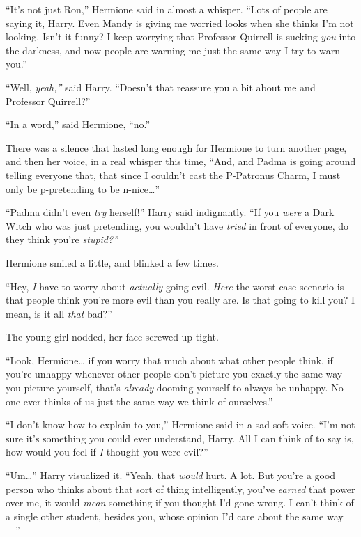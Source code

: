 ``It's not just Ron,'' Hermione said in almost a whisper. ``Lots of
people are saying it, Harry. Even Mandy is giving me worried looks when
she thinks I'm not looking. Isn't it funny? I keep worrying that
Professor Quirrell is sucking \emph{you} into the darkness, and now
people are warning me just the same way I try to warn you.''

``Well, \emph{yeah,''} said Harry. ``Doesn't that reassure you a bit
about me and Professor Quirrell?''

``In a word,'' said Hermione, ``no.''

There was a silence that lasted long enough for Hermione to turn another
page, and then her voice, in a real whisper this time, ``And, and Padma
is going around telling everyone that, that since I couldn't cast the
P-Patronus Charm, I must only be p-pretending to be n-nice\ldots{}''

``Padma didn't even \emph{try} herself!'' Harry said indignantly. ``If
you \emph{were} a Dark Witch who was just pretending, you wouldn't have
\emph{tried} in front of everyone, do they think you're \emph{stupid?''}

Hermione smiled a little, and blinked a few times.

``Hey, \emph{I} have to worry about \emph{actually} going evil.
\emph{Here} the worst case scenario is that people think you're more
evil than you really are. Is that going to kill you? I mean, is it all
\emph{that} bad?''

The young girl nodded, her face screwed up tight.

``Look, Hermione\ldots{} if you worry that much about what other people
think, if you're unhappy whenever other people don't picture you exactly
the same way you picture yourself, that's \emph{already} dooming
yourself to always be unhappy. No one ever thinks of us just the same
way we think of ourselves.''

``I don't know how to explain to you,'' Hermione said in a sad soft
voice. ``I'm not sure it's something you could ever understand, Harry.
All I can think of to say is, how would you feel if \emph{I} thought you
were evil?''

``Um\ldots{}'' Harry visualized it. ``Yeah, that \emph{would} hurt. A
lot. But you're a good person who thinks about that sort of thing
intelligently, you've \emph{earned} that power over me, it would
\emph{mean} something if you thought I'd gone wrong. I can't think of a
single other student, besides you, whose opinion I'd care about the same
way---''

